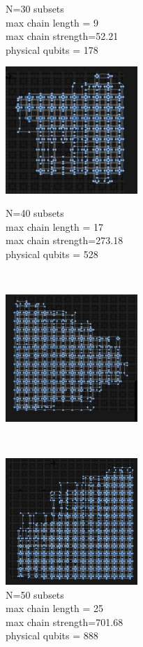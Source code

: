 \documentclass[oneside,a4paper]{article}
\begin{document}
\begin{figure}[htp]
\begin{minipage}[b]{4.5cm}
\caption{N=30 subsets\\max chain length = 9\\max chain strength=52.21\\physical qubits = 178}
\end{minipage}
\end{figure}
\begin{figure}[htp]
\begin{minipage}[b]{4.5cm}
\centering
\includegraphics[width=5cm]{LaTeXTemplate/Images/2000QN40.png}
\caption{N=40 subsets\\max chain length = 17\\max chain strength=273.18\\physical qubits = 528}
\end{minipage}
\ \hspace{2mm} \hspace{2mm} \
\begin{minipage}[b]{4.5cm}
\centering
\includegraphics[width=5cm]{LaTeXTemplate/Images/2000QN50.png}
\caption{N=50 subsets\\max chain length = 25\\max chain strength=701.68\\physical qubits = 888}
\end{minipage}
\ \hspace{2mm} \hspace{2mm} \
\begin{minipage}[b]{4.5cm}
\centering
\includegraphics[width=5cm]{LaTeXTemplate/Images/2000QN60.png}

\end{minipage}
\end{figure}
\end{document}
